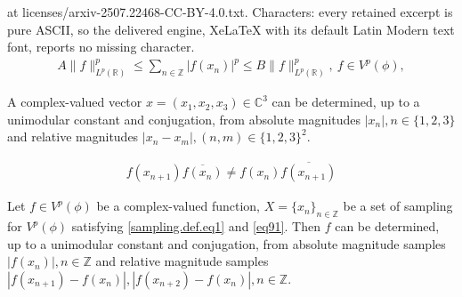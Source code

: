 \documentclass[10pt,a4paper]{amsart}
\newcommand{\C}{\mathbb{C}}
\newcommand{\R}{\mathbb{R}}
\newcommand{\Z}{\mathbb{Z}}
\begin{document}
at licenses/arxiv-2507.22468-CC-BY-4.0.txt. Characters: every retained excerpt is pure ASCII, so the delivered engine, XeLaTeX with its default Latin Modern text font, reports no missing character.
	\begin{align}\label{sampling.def.eq1}
		A\|f\|_{L^p(\R)}^p\le \sum_{n\in \Z} |f(x_n)|^p \le B\|f\|_{L^p(\R)}^p, \ f\in V^p(\phi), 
	\end{align}

	\begin{proposition}\label{prop2}
	A complex-valued vector $x=(x_1, x_2, x_3)\in \C^3$ can be determined, up to a unimodular constant and conjugation, from absolute magnitudes $ |x_n|, n\in \{1,2,3\} $ and relative magnitudes $  |x_n-x_m|, (n,m)\in \{1,2,3\}^2 $.
	\end{proposition}

	\begin{align}\label{eq91}
		f(x_{n+1})\overline{f(x_n)} \ne f(x_n) \overline{f(x_{n+1})}
	\end{align}

\begin{theorem}\label{cpr.adj.thm}
	Let $f\in V^p(\phi)$ be a complex-valued function,  $X=\{x_n\}_{n\in \Z}$ be a set of sampling for $V^p(\phi)$ satisfying \eqref{sampling.def.eq1}  and \eqref{eq91}. Then $f$ can be determined, up to a unimodular constant and conjugation, from absolute magnitude samples $ |f(x_n)|, n\in \Z $ and relative magnitude samples $|f(x_{n+1})-f(x_n)|, |f(x_{n+2})-f(x_n)|, n\in \Z$.
\end{theorem}
\end{document}
